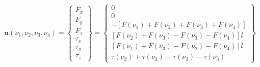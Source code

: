 \begin{equation}\label{eq:SistemaQuadrirotore_vettorecomando}
	\mathbf{u}(\nu_1,\nu_2,\nu_3,\nu_4) = 
	\begin{Bmatrix}
		F_x \\ F_y \\ F_z \\ \tau_x \\ \tau_y \\ \tau_z
	\end{Bmatrix}
	=\begin{Bmatrix}
		0 \\ 0 \\
		-\left[F(\nu_1)+F(\nu_2)+F(\nu_3)+F(\nu_4)\right] \\
		\left[F(\nu_2)+F(\nu_3)-F(\nu_3)-F(\nu_4)\right ] l \\
		\left[F(\nu_1)+F(\nu_3)-F(\nu_2)-F(\nu_4)\right] l \\
		\tau(\nu_3)+\tau(\nu_3)-\tau(\nu_3)-\tau(\nu_3)
	\end{Bmatrix}
\end{equation}

